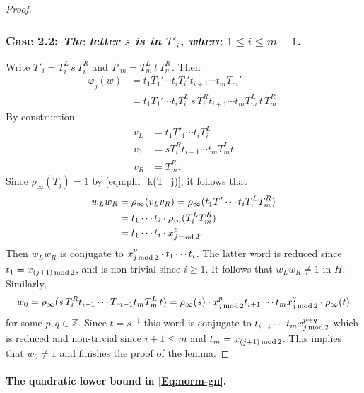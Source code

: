 \documentclass[12pt,reqno,a4paper]{article}
\theoremstyle{definition}
\theoremstyle{remark}
\numberwithin{equation}{section}
\numberwithin{figure}{section}
\begin{document}
\begin{proof}
\subsubsection*{Case 2.2: {\it The letter $s$ is in $T'_i$, where $1\leq i\leq m-1$.}}
Write $T'_i=T^L_i\, s\, T^R_i$ and $T'_m=T^L_m\, t\, T^R_m$.
Then
\begin{align*}
\varphi_{j}(w) 
&= 
t_1T_1'\cdots t_i T_i't_{i+1} %
\cdots t_m  T_m'  %
\\
&= 
t_1T_1'\cdots t_iT^L_i\, s\, T^R_i t_{i+1} \cdots t_m T^L_m\, t\, T^R_m.
\end{align*}
By construction 
\begin{align*}
v_L &= t_1T'_1\cdots t_iT^L_i\\
v_0 &= sT^R_it_{i+1}\cdots t_m T^L_mt\\
v_R &= T^R_m.
\end{align*}
Since $\rho_\infty(T_j)=1$ by \eqref{eqn:phi_k(T_j)}, it follows that
\begin{align*}
w_Lw_R &= \rho_{\infty}(v_Lv_R) =\rho_{\infty}(t_1T'_1\cdots t_i T^L_iT^R_m)\\
&=t_1\cdots t_i  \cdot \rho_{\infty}(T^L_iT^R_m) \\
&=t_1\cdots t_i \cdot x_{j\,{\rm mod}\,2}^p.
\end{align*}
Then $w_Lw_R$ is conjugate to $x_{j\,{\rm mod}\,2}^p \cdot t_1\cdots t_i$.
The latter word is reduced since $t_1=x_{(j+1)\,{\rm mod}\,2}$, and is  non-trivial since $i \geq 1$.
It follows that $w_Lw_R\neq 1$ in $H$. 
Similarly,
$$
w_0 = 
\rho_{\infty}(s\, T^R_it_{i+1}\cdots T_{m-1}t_mT^L_m\, t) 
= \rho_\infty(s) \cdot x_{j\,{\rm mod}\,2}^pt_{i+1}\cdots t_m x_{j\,{\rm mod}\,2}^q \cdot \rho_\infty(t)
$$
for some $p,q\in \mathbb Z$. 
Since $t=s^{-1}$ this word is conjugate to
$t_{i+1}\cdots t_m x_{j\,{\rm mod}\,2}^{p+q}$ which is reduced and non-trivial
since $i+1 \leq m$ and $t_m = x_{(j+1)\,{\rm mod}\,2}$. This implies that $w_0\neq 1$ and finishes
the proof of the lemma.
\end{proof}

\paragraph{The quadratic lower bound in \eqref{Eq:norm-gn}.}
\end{document}
